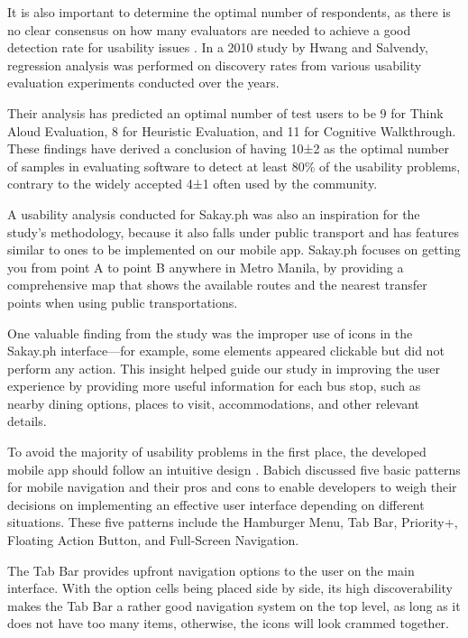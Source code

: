 \documentclass{icsthesis}
\begin{document}
\begin{mainmatter}
It is also important to determine the optimal number of respondents, as there is no clear consensus on how many evaluators are needed to achieve a good detection rate for usability issues \citep{Ref:007}. In a 2010 study by Hwang and Salvendy, regression analysis was performed on discovery rates from various usability evaluation experiments conducted over the years.

Their analysis has predicted an optimal number of test users to be 9 for Think Aloud Evaluation, 8 for Heuristic Evaluation, and 11 for Cognitive Walkthrough. These findings have derived a conclusion of having 10±2 as the optimal number of samples in evaluating software to detect at least 80\% of the usability problems, contrary to the widely accepted 4±1 often used by the community.

A usability analysis conducted for Sakay.ph \citep{Ref:018} was also an inspiration for the study’s methodology, because it also falls under public transport and has features similar to ones to be implemented on our mobile app. Sakay.ph focuses on getting you from point A to point B anywhere in Metro Manila, by providing a comprehensive map that shows the available routes and the nearest transfer points when using public transportations.

One valuable finding from the study was the improper use of icons in the Sakay.ph interface—for example, some elements appeared clickable but did not perform any action. This insight helped guide our study in improving the user experience by providing more useful information for each bus stop, such as nearby dining options, places to visit, accommodations, and other relevant details.

To avoid the majority of usability problems in the first place, the developed mobile app should follow an intuitive design \citep{Ref:003}. Babich discussed five basic patterns for mobile navigation and their pros and cons to enable developers to weigh their decisions on implementing an effective user interface depending on different situations. These five patterns include the Hamburger Menu, Tab Bar, Priority+, Floating Action Button, and Full-Screen Navigation.

The Tab Bar provides upfront navigation options to the user on the main interface. With the option cells being placed side by side, its high discoverability makes the Tab Bar a rather good navigation system on the top level, as long as it does not have too many items, otherwise, the icons will look crammed together.


\end{mainmatter}
\end{document}
